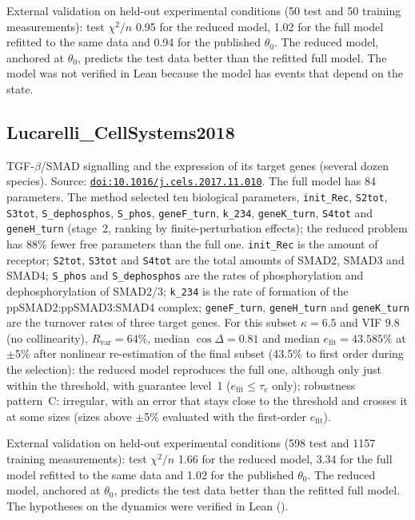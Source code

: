 External validation on held-out experimental conditions (50 test and 50 training measurements): test $\chi^2/n$ 0.95 for the reduced model, 1.02 for the full model refitted to the same data and 0.94 for the published $\theta_0$. The reduced model, anchored at $\theta_0$, predicts the test data better than the refitted full model. The model was not verified in Lean because the model has events that depend on the state.

\subsection*{Lucarelli\_CellSystems2018}

TGF-$\beta$/SMAD signalling and the expression of its target genes (several dozen species). Source: \href{https://doi.org/10.1016/j.cels.2017.11.010}{\nolinkurl{doi:10.1016/j.cels.2017.11.010}}. The full model has 84 parameters. The method selected ten biological parameters, \texttt{init\_Rec}, \texttt{S2tot}, \texttt{S3tot}, \texttt{S\_dephosphos}, \texttt{S\_phos}, \texttt{geneF\_turn}, \texttt{k\_234}, \texttt{geneK\_turn}, \texttt{S4tot} and \texttt{geneH\_turn} (stage~2, ranking by finite-perturbation effects); the reduced problem has 88\% fewer free parameters than the full one. \texttt{init\_Rec} is the amount of receptor; \texttt{S2tot}, \texttt{S3tot} and \texttt{S4tot} are the total amounts of SMAD2, SMAD3 and SMAD4; \texttt{S\_phos} and \texttt{S\_dephosphos} are the rates of phosphorylation and dephosphorylation of SMAD2/3; \texttt{k\_234} is the rate of formation of the ppSMAD2:ppSMAD3:SMAD4 complex; \texttt{geneF\_turn}, \texttt{geneH\_turn} and \texttt{geneK\_turn} are the turnover rates of three target genes. For this subset $\kappa=6.5$ and VIF $9.8$ (no collinearity), $R_{\mathrm{var}}=64\%$, median $\cos\Delta=0.81$ and median $e_{\mathrm{fit}}=43.585\%$ at $\pm$5\% after nonlinear re-estimation of the final subset (43.5\% to first order during the selection): the reduced model reproduces the full one, although only just within the threshold, with guarantee level~1 ($e_{\mathrm{fit}}\le\tau_e$ only); robustness pattern~C: irregular, with an error that stays close to the threshold and crosses it at some sizes (sizes above $\pm$5\% evaluated with the first-order $e_{\mathrm{fit}}$).

External validation on held-out experimental conditions (598 test and 1157 training measurements): test $\chi^2/n$ 1.66 for the reduced model, 3.34 for the full model refitted to the same data and 1.02 for the published $\theta_0$. The reduced model, anchored at $\theta_0$, predicts the test data better than the refitted full model. The hypotheses on the dynamics were verified in Lean ().


